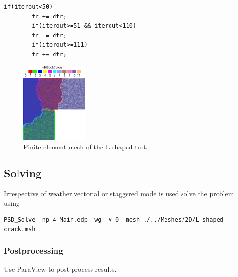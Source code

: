 \begin{itemize}
\begin{lstlisting}[style=CppStyle]
		if(iterout<50)
		tr += dtr;
		if(iterout>=51 && iterout<110) 
		tr -= dtr; 
		if(iterout>=111)
		tr += dtr; 
	\end{lstlisting}
	
	\begin{figure}[h!]
		\centering
		\includegraphics[width=0.3\textwidth]{./Images/fm-mesh.png}
		\caption{Finite element mesh of the L-shaped test. \label{L-shape-mesh}}
	\end{figure}
	
\end{itemize}


\subsection{Solving}

Irrespective of weather vectorial or staggered mode is used solve the problem using 

\begin{lstlisting}[style=BashInputStyle]
	PSD_Solve -np 4 Main.edp -wg -v 0 -mesh ./../Meshes/2D/L-shaped-crack.msh
\end{lstlisting}

\subsubsection{Postprocessing}

Use ParaView to post process results. 


